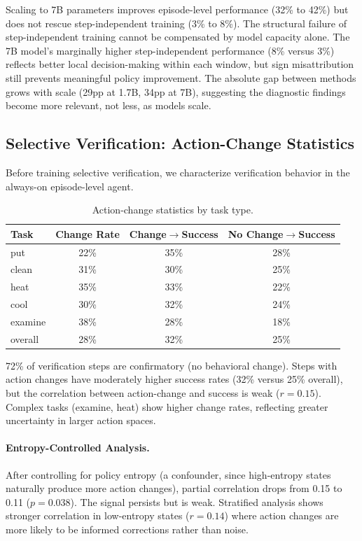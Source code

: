 \documentclass[11pt]{article}
\begin{document}
Scaling to 7B parameters improves episode-level performance (32\% to 42\%) but does not rescue step-independent training (3\% to 8\%). The structural failure of step-independent training cannot be compensated by model capacity alone. The 7B model's marginally higher step-independent performance (8\% versus 3\%) reflects better local decision-making within each window, but sign misattribution still prevents meaningful policy improvement. The absolute gap between methods grows with scale (29pp at 1.7B, 34pp at 7B), suggesting the diagnostic findings become more relevant, not less, as models scale.

\subsection{Selective Verification: Action-Change Statistics}

Before training selective verification, we characterize verification behavior in the always-on episode-level agent.

\begin{table}[h]
\centering
\caption{Action-change statistics by task type.}
\label{tab:actionchange}
\begin{tabular}{lccc}
\toprule
Task & Change Rate & Change$\rightarrow$Success & No Change$\rightarrow$Success \\
\midrule
put & 22\% & 35\% & 28\% \\
clean & 31\% & 30\% & 25\% \\
heat & 35\% & 33\% & 22\% \\
cool & 30\% & 32\% & 24\% \\
examine & 38\% & 28\% & 18\% \\
overall & 28\% & 32\% & 25\% \\
\bottomrule
\end{tabular}
\end{table}

72\% of verification steps are confirmatory (no behavioral change). Steps with action changes have moderately higher success rates (32\% versus 25\% overall), but the correlation between action-change and success is weak ($r=0.15$). Complex tasks (examine, heat) show higher change rates, reflecting greater uncertainty in larger action spaces.

\paragraph{Entropy-Controlled Analysis.}
After controlling for policy entropy (a confounder, since high-entropy states naturally produce more action changes), partial correlation drops from 0.15 to 0.11 ($p=0.038$). The signal persists but is weak. Stratified analysis shows stronger correlation in low-entropy states ($r=0.14$) where action changes are more likely to be informed corrections rather than noise.
\end{document}
